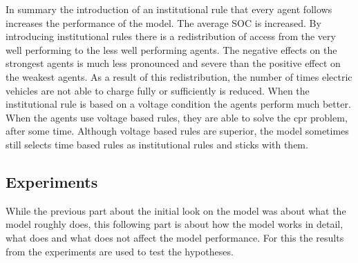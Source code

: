 \documentclass[a4paper]{article}
\begin{document}
In summary the introduction of an institutional rule that every agent follows increases the performance of the model. 
The average SOC is increased. By introducing institutional rules there is a redistribution of access from the very well 
performing to the less well performing agents. The negative effects on the strongest agents is much less pronounced and severe than the 
positive effect on the weakest agents. 
As a result of this redistribution, the number of times 
electric vehicles are not able to charge fully or sufficiently is reduced. When the institutional rule is based on a voltage condition
the agents perform much better. 
When the agents use voltage based rules, they are able to solve the cpr problem, after some time.
Although voltage based rules are superior, the model sometimes still selects time based rules as institutional rules and sticks with them. 


\subsection{Experiments}
While the previous part about the initial look on the model was about what the model roughly does, this following part is about 
how the model works in detail, what does and what does not affect the model performance. For this the results from the 
experiments are used to test the hypotheses. 
\end{document}
